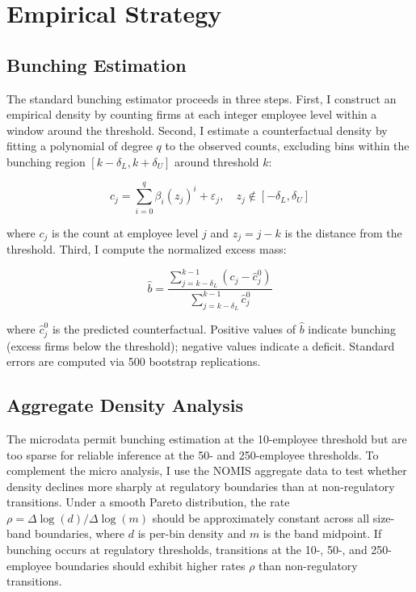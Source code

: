 \documentclass[12pt]{article}
\begin{document}



\section{Empirical Strategy}

\subsection{Bunching Estimation}

The standard bunching estimator \citep{chetty2011, kleven2016} proceeds in three steps. First, I construct an empirical density by counting firms at each integer employee level within a window around the threshold. Second, I estimate a counterfactual density by fitting a polynomial of degree $q$ to the observed counts, excluding bins within the bunching region $[k - \delta_L, k + \delta_U]$ around threshold $k$:

\begin{equation}
c_j = \sum_{i=0}^{q} \beta_i (z_j)^i + \varepsilon_j, \quad z_j \notin [-\delta_L, \delta_U]
\end{equation}

\noindent where $c_j$ is the count at employee level $j$ and $z_j = j - k$ is the distance from the threshold. Third, I compute the normalized excess mass:

\begin{equation}
\hat{b} = \frac{\sum_{j=k-\delta_L}^{k-1} (c_j - \hat{c}_j^0)}{\sum_{j=k-\delta_L}^{k-1} \hat{c}_j^0}
\end{equation}

\noindent where $\hat{c}_j^0$ is the predicted counterfactual. Positive values of $\hat{b}$ indicate bunching (excess firms below the threshold); negative values indicate a deficit. Standard errors are computed via 500 bootstrap replications.

\subsection{Aggregate Density Analysis}

The microdata permit bunching estimation at the 10-employee threshold but are too sparse for reliable inference at the 50- and 250-employee thresholds. To complement the micro analysis, I use the NOMIS aggregate data to test whether density declines more sharply at regulatory boundaries than at non-regulatory transitions. Under a smooth Pareto distribution, the rate $\rho = \Delta \log(d) / \Delta \log(m)$ should be approximately constant across all size-band boundaries, where $d$ is per-bin density and $m$ is the band midpoint. If bunching occurs at regulatory thresholds, transitions at the 10-, 50-, and 250-employee boundaries should exhibit higher rates $\rho$ than non-regulatory transitions.
\end{document}
